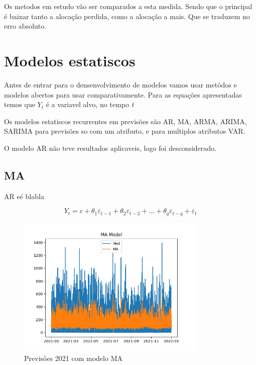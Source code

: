 Os metodos em estudo vão ser comparados a esta medida. Sendo que o principal é baixar tanto a alocação perdida, como a alocação a mais. Que se traduzem no erro absoluto.



\section{Modelos estatiscos  \label{se:model_stats}}

Antes de entrar para o densenvolvimento de modelos vamos usar metódos e modelos abertos para usar comparativamente.
Para as equações apresentadas temos que \textit{$Y_t$} é a variavel alvo, no tempo \textit{t}

Os modelos estatiscos recurrentes em previsões são AR, MA, ARMA, ARIMA, SARIMA para previsões so com um atributo, e para multiplos atributos VAR.

O modelo AR não teve resultados aplicaveis, logo foi desconsiderado.




\subsection{MA}

AR eé blabla

\begin{equation} \label{eq:MA} 
    Y_t = c + \theta_1 \varepsilon_{t-1} + \theta_2 \varepsilon_{t-2} + \dots + \theta_q \varepsilon_{t-q} + \varepsilon_t 
\end{equation}

\begin{figure}[H]
    \centering
    \includegraphics[width=0.8\textwidth]{../plots/MA_model.png}
    \caption{Previsões 2021 com modelo MA}
    \label{fig:MA_model}
\end{figure}
  
